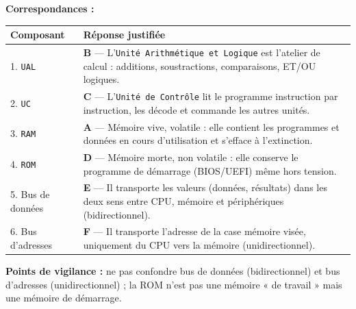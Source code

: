 \documentclass[11pt]{article}
\newcommand{\cle}[1]{{\popxbold\color{popdark}#1}}
\begin{document}
\begin{corrige}
\textbf{Correspondances :}
\begin{center}
\begin{tabularx}{\linewidth}{|l|X|}
\hline
\rowcolor{popblueL}
\textbf{Composant} & \textbf{Réponse justifiée} \\
\hline
1. \texttt{UAL} & \textbf{B} — L'\texttt{Unité Arithmétique et Logique} est l'atelier de calcul : additions, soustractions, comparaisons, ET/OU logiques. \\
\hline
2. \texttt{UC} & \textbf{C} — L'\texttt{Unité de Contrôle} lit le programme instruction par instruction, les décode et commande les autres unités. \\
\hline
3. \texttt{RAM} & \textbf{A} — Mémoire vive, \cle{volatile} : elle contient les programmes et données en cours d'utilisation et s'efface à l'extinction. \\
\hline
4. \texttt{ROM} & \textbf{D} — Mémoire morte, \cle{non volatile} : elle conserve le programme de démarrage (BIOS/UEFI) même hors tension. \\
\hline
5. Bus de données & \textbf{E} — Il transporte les valeurs (données, résultats) dans les deux sens entre CPU, mémoire et périphériques (\cle{bidirectionnel}). \\
\hline
6. Bus d'adresses & \textbf{F} — Il transporte l'adresse de la case mémoire visée, uniquement du CPU vers la mémoire (\cle{unidirectionnel}). \\
\hline
\end{tabularx}
\end{center}
\textbf{Points de vigilance :} ne pas confondre bus de données (bidirectionnel) et bus d'adresses (unidirectionnel) ; la ROM n'est pas une mémoire « de travail » mais une mémoire de démarrage.
\end{corrige}
\end{document}
